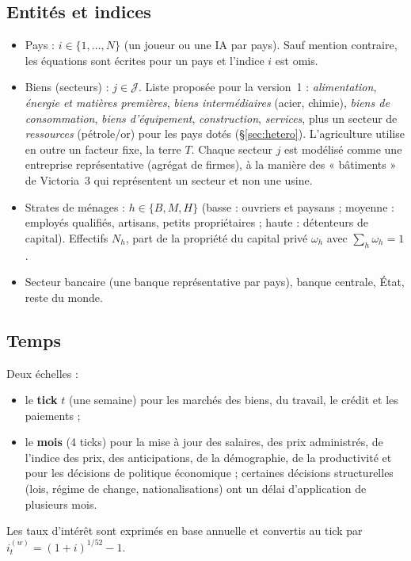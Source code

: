 \documentclass[11pt,a4paper]{article}
\newcommand{\og}{« }
\newcommand{\fg}{ »}
\begin{document}
\subsection{Entités et indices}
\begin{itemize}
\item Pays : $i \in \{1,\dots,N\}$ (un joueur ou une IA par pays). Sauf mention contraire, les équations sont écrites pour un pays et l'indice $i$ est omis.
\item Biens (secteurs) : $j \in \mathcal{J}$. Liste proposée pour la version~1 : \emph{alimentation}, \emph{énergie et matières premières}, \emph{biens intermédiaires} (acier, chimie), \emph{biens de consommation}, \emph{biens d'équipement}, \emph{construction}, \emph{services}, plus un secteur de \emph{ressources} (pétrole/or) pour les pays dotés (\S\ref{sec:hetero}). L'agriculture utilise en outre un facteur fixe, la terre $T$. Chaque secteur $j$ est modélisé comme une entreprise représentative (agrégat de firmes), à la manière des \og bâtiments\fg{} de Victoria~3 qui représentent un secteur et non une usine.
\item Strates de ménages : $h \in \{B, M, H\}$ (basse : ouvriers et paysans ; moyenne : employés qualifiés, artisans, petits propriétaires ; haute : détenteurs de capital). Effectifs $N_h$, part de la propriété du capital privé $\omega_h$ avec $\sum_h \omega_h = 1$.
\item Secteur bancaire (une banque représentative par pays), banque centrale, État, reste du monde.
\end{itemize}

\subsection{Temps}
Deux échelles :
\begin{itemize}
\item le \textbf{tick} $t$ (une semaine) pour les marchés des biens, du travail, le crédit et les paiements ;
\item le \textbf{mois} (4 ticks) pour la mise à jour des salaires, des prix administrés, de l'indice des prix, des anticipations, de la démographie, de la productivité et pour les décisions de politique économique ; certaines décisions structurelles (lois, régime de change, nationalisations) ont un délai d'application de plusieurs mois.
\end{itemize}
Les taux d'intérêt sont exprimés en base annuelle et convertis au tick par $i_t^{(w)} = (1+i)^{1/52}-1$.
\end{document}
